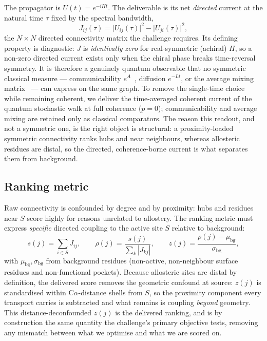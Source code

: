 \documentclass[10pt,a4paper]{article}
\begin{document}
The propagator is $U(t) = e^{-iHt}$. The deliverable is its net \emph{directed} current at the
natural time $\tau$ fixed by the spectral bandwidth,
\begin{equation}
J_{ij}(\tau) = \bigl|U_{ij}(\tau)\bigr|^{2} - \bigl|U_{ji}(\tau)\bigr|^{2},
\end{equation}
the $N\times N$ directed connectivity matrix the challenge requires. Its defining property is
diagnostic: $J$ is \emph{identically zero} for real-symmetric (achiral) $H$, so a non-zero directed
current exists only when the chiral phase breaks time-reversal symmetry. It is therefore a genuinely
quantum observable that no symmetric classical measure --- communicability $e^{A}$~\cite{estrada2008},
diffusion $e^{-Lt}$, or the average mixing matrix~\cite{godsil2013} --- can express on the same graph.
To remove the single-time choice while remaining coherent, we deliver the time-averaged coherent
current of the quantum stochastic walk at full coherence ($p=0$); communicability and average mixing
are retained only as classical comparators. The reason this readout, and not a symmetric one, is the
right object is structural: a proximity-loaded symmetric connectivity ranks hubs and near neighbours,
whereas allosteric residues are distal, so the directed, coherence-borne current is what separates
them from background.

\subsection{Ranking metric}

Raw connectivity is confounded by degree and by proximity: hubs and residues near $S$ score highly
for reasons unrelated to allostery. The ranking metric must express \emph{specific} directed coupling
to the active site $S$ relative to background:
\begin{equation}
s(j) = \sum_{i \in S} J_{ij}, \qquad
\rho(j) = \frac{s(j)}{\sum_{k} |J_{kj}|}, \qquad
z(j) = \frac{\rho(j) - \mu_{\mathrm{bg}}}{\sigma_{\mathrm{bg}}},
\end{equation}
with $\mu_{\mathrm{bg}},\sigma_{\mathrm{bg}}$ from background residues (non-active, non-neighbour
surface residues and non-functional pockets). Because allosteric sites are distal by definition, the
delivered score removes the geometric confound at source: $z(j)$ is standardised within
C$\alpha$-distance shells from $S$, so the proximity component every transport carries is subtracted
and what remains is coupling \emph{beyond} geometry. This distance-deconfounded $z(j)$ is the
delivered ranking, and is by construction the same quantity the challenge's primary objective tests,
removing any mismatch between what we optimise and what we are scored on.
\end{document}
